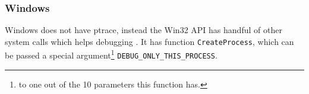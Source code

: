 \subsubsection{Windows}
Windows does not have ptrace, instead the Win32 API has handful of other system calls which helps debugging . It has function \lstinline{CreateProcess}, which can be passed a special argument\footnote{to one out of the 10 parameters this function has.} \lstinline{DEBUG_ONLY_THIS_PROCESS}.